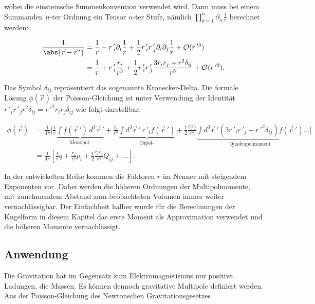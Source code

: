 \noindent
wobei die einsteinsche Summenkonvention verwendet wird.
Dann muss bei einem Summanden \(n\)-ter Ordnung ein Tensor \(n\)-ter Stufe, nämlich \(\textstyle \prod_{k=1}^{n} \partial_{i_{k}} \frac{1}{r}\) berechnet werden:


\begin{align*}
\frac{1}{\abs{ \vec{r} - \vec{r}\,'}} &= \frac{1}{r} - r\,'_{i} \partial_{i} \frac{1}{r} + \frac{1}{2} r\,'_{i} r\,'_{j} \partial_{i} \partial_{j} \frac{1}{r} + \mathcal{O}(r\,'^{3}) \\
&= \frac{1}{r} + r\,'_{i} \frac{r_{i}}{r^{3}} + \frac{1}{2} r\,'_{i} r\,'_{j} \frac{3 r_{i} r_{j} - r^{2} \delta_{i\!j}}{r^{5}} + \mathcal{O}(r\,'^{3}).
\end{align*}


\noindent
Das Symbol \(\delta_{i\!j}\) repräsentiert das sogenannte Kronecker-Delta.
Die formale Lösung \(\phi (\vec{r})\) der Poisson-Gleichung ist unter Verwendung der Identität \(r\,'_{i} r\,'_{j} r^{2} \delta_{i\!j} = r\,'^{2} r_{i} r_{j} \delta_{i\!j}\) wie folgt darstellbar:


\begin{align*}
\phi (\vec{r}) &= \frac{1}{4\pi} \Biggl[ \frac{1}{r} \underbrace{\int f (\vec{r}\,') \, d^3 \vec{r}\,'}_{\text{Monopol-}} + \frac{r_{i}}{r^{3}} \underbrace{\int d^3 \vec{r}\,' \, r\,'_{i} f (\vec{r}\,')}_{\text{Dipol-}} + \frac{1}{2} \frac{r_{i} r_{j}}{r^{5}} \underbrace{\int d^3 \vec{r}\,' \left( 3 r\,'_{i} r\,'_{j} - r\,'^{2} \delta_{i\!j} \right) f (\vec{r}\,')}_{\text{Quadrupolmoment}} \ldots \Biggr] \\
&= \frac{1}{4\pi} \left[ \frac{1}{r} q + \frac{r_{i}}{r^{3}} p_{i} + \frac{1}{2} \frac{r_{i} r_{j}}{r^{5}} Q_{i\!j} + \ldots \right].
\end{align*}


In der entwickelten Reihe kommen die Faktoren \(r\) im Nenner mit steigendem Exponenten vor.
Dabei werden die höheren Ordnungen der Multipolmomente, mit zunehmendem Abstand zum beobachteten Volumen immer weiter vernachlässigbar.
Der Einfachheit halber wurde für die Berechnungen der Kugelform in diesem Kapitel das erste Moment als Approximation verwendet und die höheren Momente vernachlässigt.



\subsection{Anwendung
\label{planet:subsection:anwendung}}

Die Gravitation hat im Gegensatz zum Elektromagnetismus nur positive Ladungen, die Massen.
Es können dennoch gravitative Multipole definiert werden.
Aus der Poisson-Gleichung des Newtonschen Gravitationsgesetzes

